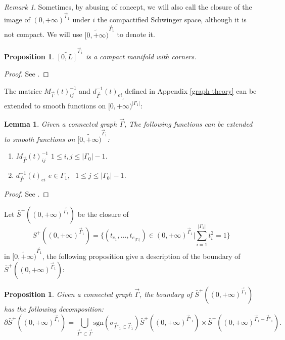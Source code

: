\documentclass[11pt]{amsart}
\newtheorem{lem}[thm]{Lemma}
\newtheorem{prop}[thm]{Proposition}
\theoremstyle{definition}
\theoremstyle{remark}
\newtheorem{rem}[thm]{Remark}
\numberwithin{equation}{section}
\begin{document}
\begin{rem}
  Sometimes, by abusing of concept, we will also call the closure of the image
  of $(0, + \infty)^{\vec{\Gamma}_1 }$ under $i$ the compactified Schwinger
  space, although it is not compact. We will use $\widetilde{[0, + \infty)}^{\vec{\Gamma}_1}$ to denote it.
\end{rem}

\begin{prop}
  $\widetilde{[0, L]}^{\vec{\Gamma}_1}$ is a compact manifold with corners.
\end{prop}

\begin{proof}
  See {\cite{Ammann2019ACO}}.
\end{proof}

The matrice $M_{\vec{\Gamma}} (t)^{- 1}_{i j}$ and $d^{-1}_{\vec{\Gamma}}(t)_{ei}$
defined in Appendix \ref{graph theory} can be extended to smooth functions on
$\widetilde{[0, + \infty)^{| \Gamma_1 |}}$:

\begin{lem}
  \label{extended functions}Given a connected graph $\vec{\Gamma}$, The following functions can be extended to smooth functions on
  $\widetilde{[0, + \infty)}^{ \vec{\Gamma}_1 }$:
  \begin{enumerate}
    \item $M_{\vec{\Gamma}} (t)^{- 1}_{i j}$  $1 \leqslant i, j \leqslant |
    \Gamma_0 | - 1$.
    
    \item $d^{-1}_{\vec{\Gamma}}(t)_{ei}$  $e \in \Gamma_1, \text{ } 1
    \leqslant j \leqslant | \Gamma_0 | - 1$.
  \end{enumerate}
\end{lem}

\begin{proof}
  See {\cite{wang2024feynman}}.
\end{proof}


Let $\bar{S}^{+}((0,+\infty)^{\vec{\Gamma}_{1}})$ be the closure of 
$$
    S^{+}((0,+\infty)^{\vec{\Gamma}_{1}})=\{(t_{e_{1}},\dots,t_{e_{|\Gamma_{1}|}})\in(0,+\infty)^{\vec{\Gamma}_{1}}|\sum_{i=1}^{|\Gamma_{1}|}t_{i}^{2}=1\}
$$in $\widetilde{[0,+\infty)}^{\vec{\Gamma}_{1}}$, the following proposition give a description of the boundary of $\bar{S}^{+}((0,+\infty)^{\vec{\Gamma}_{1}})$:

\begin{prop}
  \label{boundary description}Given a connected graph $\vec{\Gamma}$, the boundary of
  $\bar{S}^{+}((0,+\infty)^{\vec{\Gamma}_{1}})$ has the following decomposition:
  \[ \partial \bar{S}^{+}((0,+\infty)^{\vec{\Gamma}_{1}}) = \bigcup_{\vec{\Gamma}'
       \subset \vec{\Gamma}} \mathrm{sgn}(\sigma_{\vec{\Gamma}'_{1}\subset \vec{\Gamma}_{1}})
       \bar{S}^{+}((0,+\infty)^{\vec{\Gamma}'_{1}}) \times
       \bar{S}^{+}((0,+\infty)^{\vec{\Gamma}_{1}- \vec{\Gamma}'_{1}}). \]
\end{prop}
\end{document}
